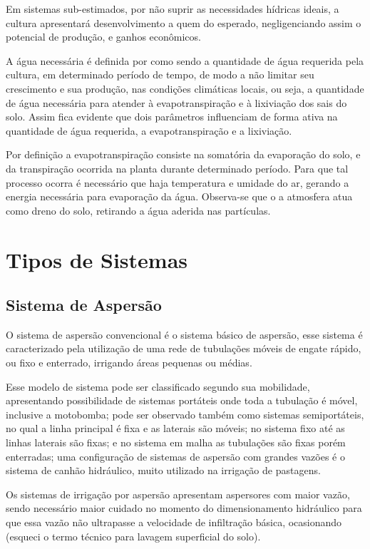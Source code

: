 Em sistemas sub-estimados, por não suprir as necessidades hídricas ideais, a cultura apresentará desenvolvimento a quem do esperado, negligenciando assim o potencial de produção, e ganhos econômicos.

A água necessária é definida por \cite{bernardo2006} como sendo a quantidade de água requerida pela cultura, em determinado período de tempo, de modo a não limitar seu crescimento e sua produção, nas condições climáticas locais, ou seja, a quantidade de água necessária para atender à evapotranspiração e à lixiviação dos sais do solo. Assim fica evidente que dois parâmetros influenciam de forma ativa na quantidade de água requerida, a evapotranspiração e a lixiviação.

Por definição a evapotranspiração consiste na somatória da evaporação do solo, e da transpiração ocorrida na planta durante determinado período. Para que tal processo ocorra é necessário que haja temperatura e umidade do ar, gerando a energia necessária para evaporação da água. Observa-se que o a atmosfera atua como dreno do solo, retirando a água aderida nas partículas.

\section{Tipos de Sistemas}

\subsection{Sistema de Aspersão}

O sistema de aspersão convencional é o sistema básico de aspersão, esse sistema é caracterizado pela utilização de uma rede de tubulações móveis de engate rápido, ou fixo e enterrado, irrigando áreas pequenas ou médias.

Esse modelo de sistema pode ser classificado segundo sua mobilidade, apresentando possibilidade de sistemas portáteis onde toda a tubulação é móvel, inclusive a motobomba; pode ser observado também como sistemas semiportáteis, no qual a linha principal é fixa e as laterais são móveis; no sistema fixo até as linhas laterais são fixas; e no sistema em malha as tubulações são fixas porém enterradas; uma configuração de sistemas de aspersão com grandes vazões é o sistema de canhão hidráulico, muito utilizado na irrigação de pastagens.

Os sistemas de irrigação por aspersão apresentam aspersores com maior vazão, sendo necessário maior cuidado no momento do dimensionamento hidráulico para que essa vazão não ultrapasse a velocidade de infiltração básica, ocasionando (esqueci o termo técnico para lavagem superficial do solo).

